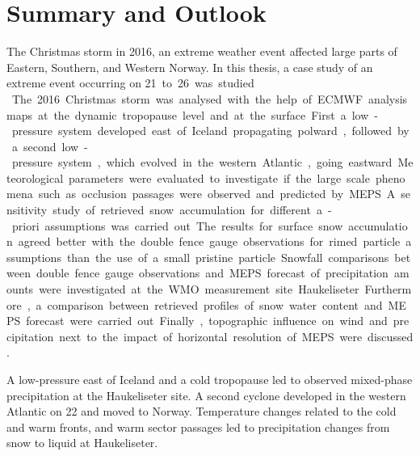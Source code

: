 
\chapter{Summary and Outlook}
The %
Christmas storm in 2016, an extreme weather event
affected large parts of Eastern, Southern, and Western Norway. 
In this thesis, a case study of an extreme event %
occurring on \SI{21} to \SI{26}{\dec} %
was studied. 
\\
The 2016 Christmas storm was analysed with the help of ECMWF analysis maps at the dynamic tropopause level and at the surface. First a low-pressure system developed east of Iceland propagating polward, followed by a second low-pressure system, which evolved in the western Atlantic, going eastward.
Meteorological parameters were evaluated to investigate if the large scale phenomena such as occlusion passages were observed and predicted by MEPS.
A sensitivity study of retrieved snow accumulation for different a-priori assumptions was carried out. The results for surface snow accumulation agreed better with the double fence gauge observations for rimed particle assumptions than the use of a small pristine particle.
Snowfall comparisons between double fence gauge observations and MEPS forecast of precipitation amounts were investigated at the WMO measurement site Haukeliseter. 
Furthermore, a comparison between retrieved profiles of snow water content %
and MEPS forecast were carried out. %
Finally, topographic influence on wind and precipitation %
next to the impact of horizontal resolution of MEPS were discussed. %
\par\medskip
\noindent
A low-pressure east of Iceland and a cold tropopause led to observed mixed-phase precipitation at the Haukeliseter site. A second cyclone developed in the western Atlantic on \SI{22}{\dec} and moved to Norway. Temperature changes related to the cold and warm fronts, and warm sector passages led to precipitation changes from snow to liquid at Haukeliseter. 
